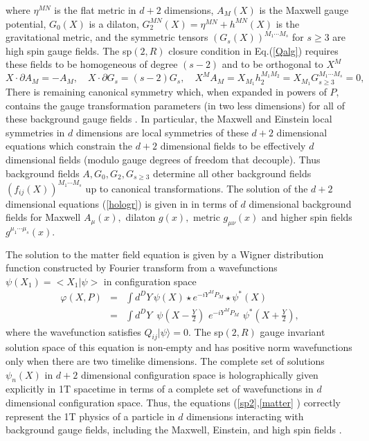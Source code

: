 \documentclass[a4paper,12pt]{article}
\begin{document}
where $\eta ^{MN}$ is the flat metric in $d+2$ dimensions,
$A_{M}\left( X\right) $ is the Maxwell gauge potential,
$G_{0}\left( X\right) $ is a dilaton, $G_{2}^{MN}\left( X\right)
=\eta ^{MN}+h^{MN}\left( X\right) $ is the gravitational metric,
and the symmetric tensors $\left( G_{s}\left( X\right) \right)
^{M_{1}\cdots M_{s}}$ for $s\geq 3$ are high spin gauge fields.
The sp$\left( 2,R\right) $ closure condition in Eq.(\ref{Qalg})
requires these fields to be homogeneous of degree $(s-2)$ and to
be orthogonal to $X^{M}$
\begin{equation}
X\cdot \partial A_M=-A_M, \quad X\cdot \partial G_{s}=\left(
s-2\right) G_{s},\quad
X^{M}A_{M}=X_{M_{1}}h_{2}^{M_{1}M_{2}}=X_{M_{1}}G_{s\geq
3}^{M_{1}\cdots M_{s}}=0,  \label{hologr}
\end{equation}
There is remaining canonical symmetry which, when expanded in
powers of $P,$ contains the gauge transformation parameters (in
two less dimensions) for all of these background gauge fields
\cite{highspin}. In particular, the Maxwell and Einstein local
symmetries in $d$ dimensions are local symmetries of these $d+2$
dimensional equations which constrain the $d+2$ dimensional
fields to be effectively $d$ dimensional fields (modulo gauge
degrees of freedom that decouple). Thus background fields
$A,G_{0},G_{2},G_{s\geq 3}$ determine all other background fields
$\left( f_{ij}\left( X\right) \right) ^{M_{1}\cdots M_{s}}$ up to
canonical transformations$.$ The solution of the $d+2$ dimensional
equations (\ref {hologr}) is given in \cite{highspin} in terms of
$d$ dimensional background fields for Maxwell $A_{\mu }\left(
x\right) ,$ dilaton $g\left( x\right) ,$ metric $g_{\mu \nu
}\left( x\right) $ and higher spin fields $g^{\mu _{1}\cdots \mu
_{s}}\left( x\right) .$

The solution to the matter field equation is given by a Wigner
distribution function constructed by Fourier transform from a
wavefunctions $ \psi \left( X_{1}\right) =<X_{1}|\psi >$ in
configuration space
\begin{eqnarray}
\varphi \left( X,P\right) &=&\int d^{D}Y\,\psi \left( X\right) \star
e^{-iY^{M}P_{M}}\star \psi ^{\ast }\left( X\right) \\
&=&\int d^{D}Y\,\,\,\psi \left( X-\frac{Y}{2}\right)
\,\,e^{-iY^{M}P_{M}}\,\,\psi ^{\ast }\left( X+\frac{Y}{2}\right) ,
\end{eqnarray}
where the wavefunction satisfies $Q_{ij}|\psi \rangle =0.$ The
sp$\left( 2,R\right) $ gauge invariant solution space
\cite{field2T} of this equation is non-empty and has positive norm
wavefunctions only when there are two timelike dimensions. The
complete set of solutions $\psi _{n}\left( X\right) $ in $d+2$
dimensional configuration space is holographically given
explicitly in 1T spacetime in terms of a complete set of
wavefunctions in $d$ dimensional configuration space. Thus, the
equations (\ref{sp2},\ref{matter} ) correctly represent the 1T
physics of a particle in $d$ dimensions interacting with
background gauge fields, including the Maxwell, Einstein, and high
spin fields \cite{NCSp}.
\end{document}
